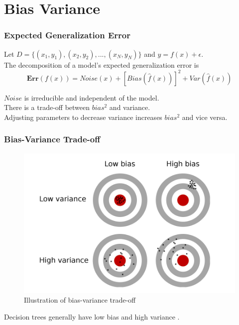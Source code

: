 
\section{Bias Variance}

\begin{frame}
    \frametitle{Expected Generalization Error}
    Let $D = \{(x_{1},y_{1}), (x_{2}, y_{2}), ... , (x_{N}, y_{N})\}$ and  $y = f(x) + \epsilon$. \\
       
    The decomposition of a model's expected generalization error is
    \begin{equation}
        \boldsymbol{Err}(f(x)) = Noise(x) + [Bias(\hat{f}(x))]^2 + Var(\hat{f}(x))
    \end{equation}
    
    $Noise$ is irreducible and independent of the model. \\
    There is a trade-off between $bias^2$ and variance. \\
    Adjusting parameters to decrease variance increases $bias^2$ and vice versa.
\end{frame}

\begin{frame}
    \frametitle{Bias-Variance Trade-off}
    \begin{figure}      
        \includegraphics{images/bias-variance.png}
        \caption{Illustration of bias-variance trade-off \cite{van2019bias}}
    \end{figure}
    Decision trees generally have low bias and high variance \cite{friedman2001elements}.

\end{frame}

